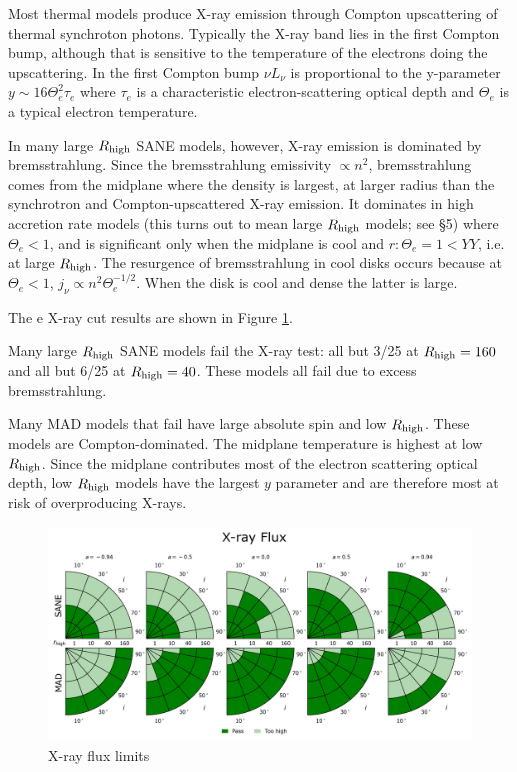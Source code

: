

Most thermal models produce X-ray emission through Compton upscattering of thermal synchroton photons.  Typically the X-ray band lies in the first Compton bump, although that is sensitive to the temperature of the electrons doing the upscattering.  In the first Compton bump $\nu L_\nu$ is proportional to the y-parameter $y \sim 16 \Theta_e^2 \tau_e$ where $\tau_e$ is a characteristic electron-scattering optical depth and $\Theta_e$ is a typical electron temperature.

In many large $R_\mathrm{high}$ SANE models, however, X-ray emission is dominated by bremsstrahlung.  Since the bremsstrahlung emissivity $\propto n^2$, bremsstrahlung comes from the midplane where the density is largest, at larger radius than the synchrotron and Compton-upscattered X-ray emission.  It dominates in high accretion rate models (this turns out to mean large $R_\mathrm{high}$ models; see \S 5) where $\Theta_e < 1$, and is significant only when the midplane is cool and $r: \Theta_e = 1 < YY$, i.e. at large $R_\mathrm{high}$.  The resurgence of bremsstrahlung in cool disks occurs because at $\Theta_e < 1$, $j_\nu \propto n^2 \Theta_e^{-1/2}$.  When the disk is cool and dense the latter is large.

The e X-ray cut results are shown in Figure \ref{fig:cmp_xray_flux}.

Many large $R_\mathrm{high}$ SANE models fail the X-ray test: all but 3/25 at $R_\mathrm{high} = 160$ and all but 6/25 at $R_\mathrm{high} = 40$.  These models all fail due to excess bremsstrahlung.

Many MAD models that fail have large absolute spin and low $R_\mathrm{high}$.  These models are Compton-dominated.  The midplane temperature is highest at low $R_\mathrm{high}$.  Since the midplane contributes most of the electron scattering optical depth, low $R_\mathrm{high}$ models have the largest $y$ parameter and are therefore most at risk of overproducing X-rays.

\begin{figure}
  \centering
  \includegraphics[width=\columnwidth]{./figures/Xray_flux_Constraints.png}
  \caption{X-ray flux limits}
  \label{fig:cmp_xray_flux}
\end{figure}


